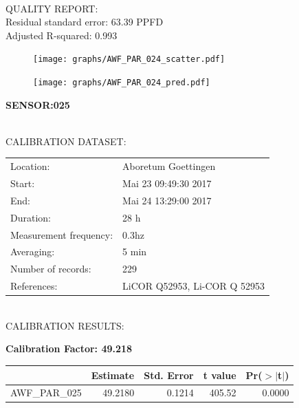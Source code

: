 \documentclass[oneside]{report}
\begin{document}
\hrulefill\\
QUALITY REPORT:\\
Residual standard error: 63.39 PPFD\\
Adjusted R-squared: 0.993



\begin{figure}[H]
  \centering
  \texttt{[image: graphs/AWF\_PAR\_024\_scatter.pdf]}
\end{figure}




\begin{figure}[H]
  \centering
  \texttt{[image: graphs/AWF\_PAR\_024\_pred.pdf]}
\end{figure}

\pagebreak


\begin{center}
\large{\textbf{SENSOR:025}}\\
\end{center}

\hrulefill\\
CALIBRATION DATASET:\\
\begin{table}[h!]
  \centering
  \label{tab:table1}
  \begin{tabular}{ll}
    Location: & Aboretum Goettingen\\ 
    
    
    Start:  & Mai 23 09:49:30 2017 \\
    End:   & Mai 24 13:29:00 2017\\ 
    Duration: & 28 h\\
    Measurement frequency: & 0.3hz\\
    Averaging:  &5 min\\
    Number of records: & 229 \\
    References: & LiCOR Q52953, Li-COR Q 52953 \\
  \end{tabular}
\end{table}

\hrulefill\\
CALIBRATION RESULTS:\\


\begin{center}
\textbf{\large{Calibration Factor: 49.218}}\\
\end{center}
\begin{table}[ht]
\centering
\begin{tabular}{rrrrr}
  \hline
 & Estimate & Std. Error & t value & Pr($>$$|$t$|$) \\ 
  \hline
AWF\_PAR\_025 & 49.2180 & 0.1214 & 405.52 & 0.0000 \\ 
   \hline
\end{tabular}
\end{table}
\end{document}
